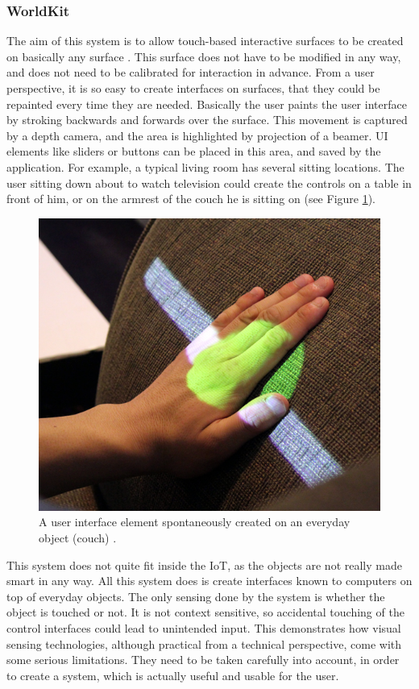 \subsubsection{WorldKit}
\label{sec:worldKit}
The aim of this system is to allow touch-based interactive surfaces to be created on basically any surface \cite{xiao13}. 
This surface does not have to be modified in any way, and does not need to be calibrated for interaction in advance. 
From a user perspective, it is so easy to create interfaces on surfaces, that they could be repainted every time they are needed. 
Basically the user paints the user interface by stroking backwards and forwards over the surface. 
This movement is captured by a depth camera, and the area is highlighted by projection of a beamer. 
UI elements like sliders or buttons can be placed in this area, and saved by the application. 
For example, a typical living room has several sitting locations. 
The user sitting down about to watch television could create the controls on a table in front of him, or on the armrest of the couch he is sitting on (see Figure \ref{fig:worldkit}).
\begin{figure}[!t]
	\centering
	\includegraphics[width=0.9\columnwidth]{Images/worldkit}
	\caption{A user interface element spontaneously created on an everyday object (couch) \cite{xiao13}.}
	\label{fig:worldkit}
\end{figure}

This system does not quite fit inside the IoT, as the objects are not really made smart in any way. 
All this system does is create interfaces known to computers on top of everyday objects. 
The only sensing done by the system is whether the object is touched or not. 
It is not context sensitive, so accidental touching of the control interfaces could lead to unintended input. 
This demonstrates how visual sensing technologies, although practical from a technical perspective, come with some serious limitations. 
They need to be taken carefully into account, in order to create a system, which is actually useful and usable for the user.

